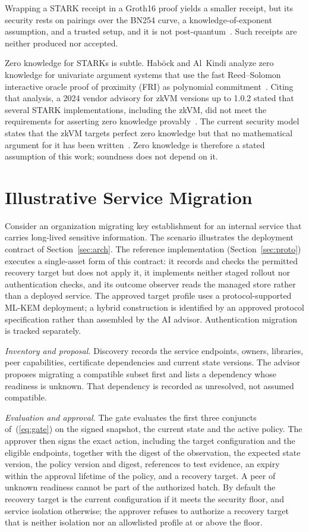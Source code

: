 \documentclass[journal]{IEEEtran}
\begin{document}
Wrapping a STARK receipt in a Groth16 proof yields a smaller receipt, but its security rests on pairings over the BN254 curve, a knowledge-of-exponent assumption, and a trusted setup, and it is not post-quantum~\cite{risc0sec}. Such receipts are neither produced nor accepted.

Zero knowledge for STARKs is subtle. Hab\"ock and Al~Kindi analyze zero knowledge for univariate argument systems that use the fast Reed--Solomon interactive oracle proof of proximity (FRI) as polynomial commitment~\cite{habock}. Citing that analysis, a 2024 vendor advisory for zkVM versions up to 1.0.2 stated that several STARK implementations, including the zkVM, did not meet the requirements for asserting zero knowledge provably~\cite{risc0adv}. The current security model states that the zkVM targets perfect zero knowledge but that no mathematical argument for it has been written~\cite{risc0sec}. Zero knowledge is therefore a stated assumption of this work; soundness does not depend on it.

\section{Illustrative Service Migration}
\label{sec:scenario}
Consider an organization migrating key establishment for an internal service that carries long-lived sensitive information. The scenario illustrates the deployment contract of Section~\ref{sec:arch}. The reference implementation (Section~\ref{sec:proto}) executes a single-asset form of this contract: it records and checks the permitted recovery target but does not apply it, it implements neither staged rollout nor authentication checks, and its outcome observer reads the managed store rather than a deployed service. The approved target profile uses a protocol-supported ML-KEM deployment; a hybrid construction is identified by an approved protocol specification rather than assembled by the AI advisor. Authentication migration is tracked separately.

\emph{Inventory and proposal.} Discovery records the service endpoints, owners, libraries, peer capabilities, certificate dependencies and current state versions. The advisor proposes migrating a compatible subset first and lists a dependency whose readiness is unknown. That dependency is recorded as unresolved, not assumed compatible.

\emph{Evaluation and approval.} The gate evaluates the first three conjuncts of~(\ref{eq:gate}) on the signed snapshot, the current state and the active policy. The approver then signs the exact action, including the target configuration and the eligible endpoints, together with the digest of the observation, the expected state version, the policy version and digest, references to test evidence, an expiry within the approval lifetime of the policy, and a recovery target. A peer of unknown readiness cannot be part of the authorized batch. By default the recovery target is the current configuration if it meets the security floor, and service isolation otherwise; the approver refuses to authorize a recovery target that is neither isolation nor an allowlisted profile at or above the floor.
\end{document}
